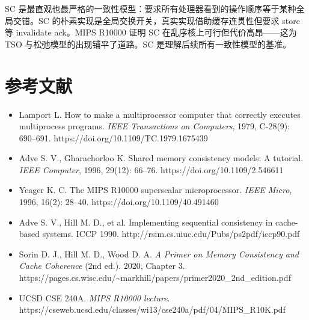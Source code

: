SC 是最直观也最严格的一致性模型：要求所有处理器看到的操作顺序等于某种全局交错。SC 的朴素实现是全局交换开关，真实实现借助缓存连贯性但要求 store 等 invalidate ack。MIPS R10000 证明 SC 在乱序核上可行但代价高昂——这为 TSO 与松弛模型的出现铺平了道路。SC 是理解后续所有一致性模型的基准。

\section*{参考文献}
\begin{itemize}
\item Lamport L. How to make a multiprocessor computer that correctly executes multiprocess programs. \emph{IEEE Transactions on Computers}, 1979, C-28(9): 690–691. https://doi.org/10.1109/TC.1979.1675439
\item Adve S. V., Gharachorloo K. Shared memory consistency models: A tutorial. \emph{IEEE Computer}, 1996, 29(12): 66–76. https://doi.org/10.1109/2.546611
\item Yeager K. C. The MIPS R10000 superscalar microprocessor. \emph{IEEE Micro}, 1996, 16(2): 28–40. https://doi.org/10.1109/40.491460
\item Adve S. V., Hill M. D., et al. Implementing sequential consistency in cache-based systems. ICCP 1990. http://rsim.cs.uiuc.edu/Pubs/ps2pdf/iccp90.pdf
\item Sorin D. J., Hill M. D., Wood D. A. \emph{A Primer on Memory Consistency and Cache Coherence} (2nd ed.). 2020, Chapter 3. https://pages.cs.wisc.edu/\textasciitilde{}markhill/papers/primer2020\_2nd\_edition.pdf
\item UCSD CSE 240A. \emph{MIPS R10000 lecture}. https://cseweb.ucsd.edu/classes/wi13/cse240a/pdf/04/MIPS\_R10K.pdf
\end{itemize}
